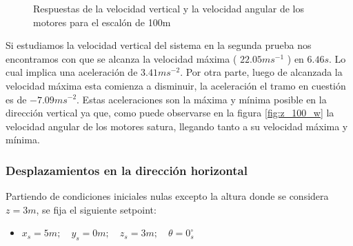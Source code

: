 \documentclass[main]{subfiles}
\begin{document}
\begin{figure}
  \centering
  \caption{Respuestas de la velocidad vertical y la velocidad angular de los motores para el escal\'on de 100m}
  \label{fig:hov_esc_z_otros}
\end{figure}

Si estudiamos la velocidad vertical del sistema en la segunda prueba nos encontramos con que se alcanza la velocidad m\'axima ( $22.05 ms^{-1}$ ) en $6.46 s$. Lo cual implica una aceleraci\'on de $3.41 ms^{-2}$. Por otra parte, luego de alcanzada la velocidad m\'axima esta comienza a disminuir, la aceleraci\'on el tramo en cuesti\'on es de $-7.09ms^{-2}$. Estas aceleraciones son  la m\'axima y m\'inima posible en la direcci\'on vertical ya que, como puede observarse en la figura \ref{fig:z_100_w} la velocidad angular de los motores satura, llegando tanto a su velocidad m\'axima y m\'inima. 

\subsubsection{Desplazamientos en la direcci\'on horizontal}
Partiendo de condiciones iniciales nulas excepto la altura donde se considera $z = 3 m$, se fija el siguiente setpoint:
\begin{itemize}
\item ${x_s = 5 m;\quad y_s = 0 m;\quad z_s = 3 m;\quad \theta = 0_s^\circ}$
\end{itemize}
\end{document}
